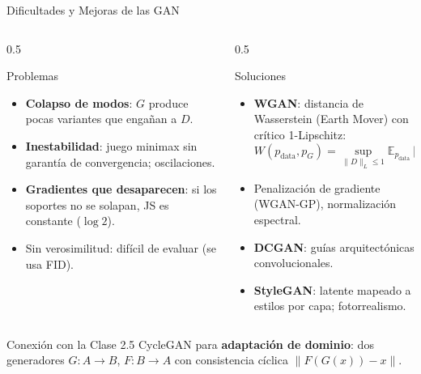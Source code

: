 \documentclass[aspectratio=169, 10pt]{beamer}
\providecommand{\E}{\mathbb{E}}
\newcommand{\pdata}{p_{\text{data}}}
\begin{document}
\begin{frame}[shrink]{Dificultades y Mejoras de las GAN}

	\begin{columns}[T]
		\begin{column}{0.5\textwidth}
			\begin{alertblock}{Problemas}
				\small
				\begin{itemize}
					\item \textbf{Colapso de modos}: $G$ produce pocas variantes que enga\~nan a $D$.
					\item \textbf{Inestabilidad}: juego minimax sin garant\'ia de convergencia; oscilaciones.
					\item \textbf{Gradientes que desaparecen}: si los soportes no se solapan, JS es constante ($\log 2$).
					\item Sin verosimilitud: dif\'icil de evaluar (se usa FID).
				\end{itemize}
			\end{alertblock}
		\end{column}

		\begin{column}{0.5\textwidth}
			\begin{block}{Soluciones}
				\small
				\begin{itemize}
					\item \textbf{WGAN}: distancia de Wasserstein (Earth Mover) con cr\'itico 1-Lipschitz:
					\[
					W(\pdata, p_G) = \sup_{\|D\|_L \le 1} \E_{\pdata}[D(x)] - \E_{p_G}[D(x)]
					\]
					\item Penalizaci\'on de gradiente (WGAN-GP), normalizaci\'on espectral.
					\item \textbf{DCGAN}: gu\'ias arquitect\'onicas convolucionales.
					\item \textbf{StyleGAN}: latente mapeado a estilos por capa; fotorrealismo.
				\end{itemize}
			\end{block}
		\end{column}
	\end{columns}

	\vspace{0.3cm}

	\begin{block}{Conexi\'on con la Clase 2.5}
		CycleGAN para \textbf{adaptaci\'on de dominio}: dos generadores $G: A\to B$, $F: B\to A$ con consistencia c\'iclica $\|F(G(x)) - x\|$.
	\end{block}

\end{frame}
\end{document}
